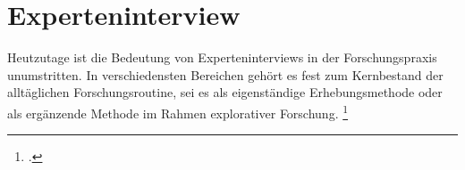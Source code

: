 \section{Experteninterview} \label{Experteninterview}
Heutzutage ist die Bedeutung von Experteninterviews in der Forschungspraxis unumstritten. In verschiedensten Bereichen gehört es fest zum Kernbestand der alltäglichen Forschungsroutine, sei es als eigenständige Erhebungsmethode oder als ergänzende Methode im Rahmen explorativer Forschung. \footcite[Vgl.][S. 1]{Bogner_2014_Interview}

%




